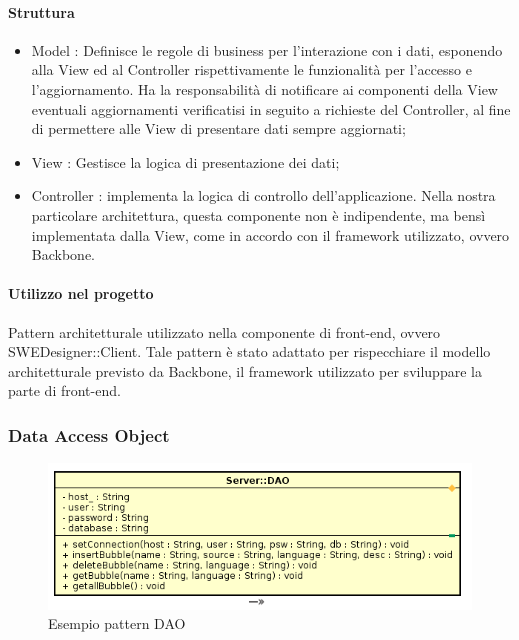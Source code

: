 \documentclass[../PianoDiQualifica.tex]{subfiles}
\begin{document}
				\paragraph{Struttura\\}			
				\begin{itemize}
					\item Model : Definisce le regole di business per l’interazione con i dati, esponendo alla View ed al Controller rispettivamente le funzionalità per l’accesso e l’aggiornamento.
					Ha la responsabilità di notificare ai componenti della View eventuali aggiornamenti verificatisi in seguito a richieste del Controller, al fine di permettere alle View di presentare dati sempre aggiornati;
					\item View : Gestisce la logica di presentazione dei dati;
					\item Controller : implementa la logica di controllo dell’applicazione. Nella nostra particolare architettura, questa componente non è indipendente, ma bensì implementata dalla View, come in accordo con il framework utilizzato, ovvero Backbone.
				\end{itemize}			
				\paragraph{Utilizzo nel progetto\\}
				Pattern architetturale utilizzato nella componente di front-end, ovvero SWEDesigner::Client. Tale pattern è stato adattato per rispecchiare il modello architetturale previsto da Backbone, il framework utilizzato per sviluppare la parte di front-end.
				
			\subsubsection{Data Access Object}
			\begin{figure}[H] \label{fig:DAO}
				\centering
				\includegraphics[scale=0.8]{Immagini/DAO.png}
				\caption{Esempio pattern DAO}
			\end{figure}
\end{document}
